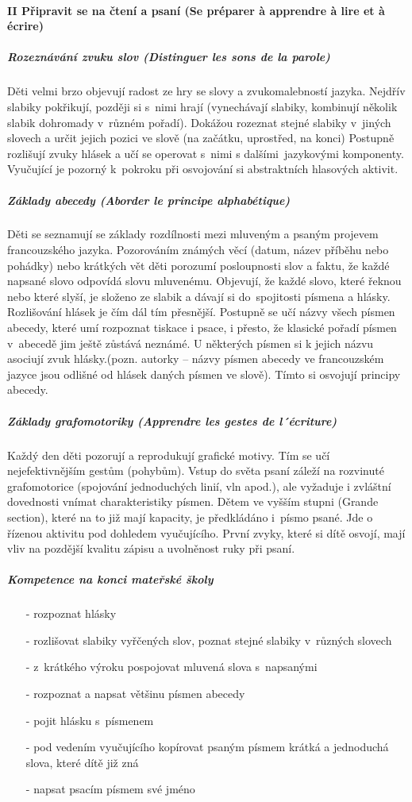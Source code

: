 			\paragraph*{II Připravit se na čtení a psaní (Se préparer à apprendre à lire et à écrire)}
				\subparagraph{Rozeznávání zvuku slov (Distinguer les sons de la parole)}
					Děti velmi brzo objevují radost ze hry se slovy a zvukomalebností jazyka. Nejdřív slabiky pokřikují, později si s nimi hrají (vynechávají slabiky, kombinují několik slabik dohromady v různém pořadí). Dokážou rozeznat stejné slabiky v jiných slovech a určit jejich pozici ve slově (na začátku, uprostřed, na konci)
					Postupně rozlišují zvuky hlásek a učí se operovat s nimi s dalšími jazykovými komponenty. Vyučující je pozorný k pokroku při osvojování si abstraktních hlasových aktivit.
				\subparagraph{Základy abecedy (Aborder le principe alphabétique)}
					Děti se seznamují se základy rozdílnosti mezi mluveným a psaným projevem francouzského jazyka. Pozorováním známých věcí (datum, název příběhu nebo pohádky) nebo krátkých vět děti porozumí posloupnosti slov a faktu, že každé napsané slovo odpovídá slovu mluvenému. 
					Objevují, že každé slovo, které řeknou nebo které slyší, je složeno ze slabik a dávají si do spojitosti písmena a hlásky. Rozlišování hlásek je čím dál tím přesnější. Postupně se učí názvy všech písmen abecedy, které umí rozpoznat tiskace i psace, i přesto, že klasické pořadí písmen v abecedě jim ještě zůstává neznámé. U některých písmen si k jejich názvu asociují zvuk hlásky.(pozn. autorky – názvy písmen abecedy ve francouzském jazyce jsou odlišné od hlásek daných písmen ve slově). Tímto si osvojují principy abecedy.
				\subparagraph{Základy grafomotoriky (Apprendre les gestes de l´écriture)} 
					Každý den děti pozorují a reprodukují grafické motivy. Tím se učí nejefektivnějším gestům (pohybům). Vstup do světa psaní záleží na rozvinuté grafomotorice (spojování jednoduchých linií, vln apod.), ale vyžaduje i zvláštní dovednosti vnímat charakteristiky písmen. 
					Dětem ve vyšším stupni (Grande section), které na to již mají kapacity, je předkládáno i písmo psané. Jde o řízenou aktivitu pod dohledem vyučujícího. První zvyky, které si dítě osvojí, mají vliv na pozdější kvalitu zápisu a uvolněnost ruky při psaní. 
					
					\subparagraph{Kompetence na konci mateřské školy}
					\begin{itemize}
						\setlength\itemsep{-2mm}
						\item[-] rozpoznat hlásky
						\item[-] rozlišovat slabiky vyřčených slov, poznat stejné slabiky v různých slovech
						\item[-] z krátkého výroku pospojovat mluvená slova s napsanými
						\item[-] rozpoznat a napsat většinu písmen abecedy
						\item[-] pojit hlásku s písmenem
						\item[-] pod vedením vyučujícího kopírovat psaným písmem krátká a jednoduchá slova, které dítě již zná
						\item[-] napsat psacím písmem své jméno
					\end{itemize}


